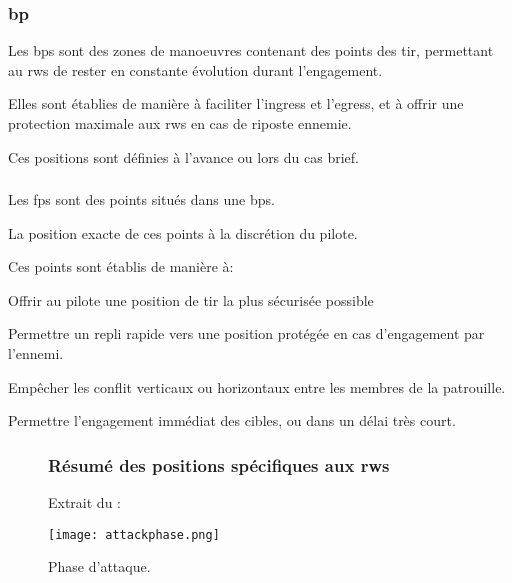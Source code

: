\subsubsection{\acrfull{bp}}

\e
    \item Les \glspl{bp} sont des zones de manoeuvres contenant des points des tir, permettant au \glspl{rw} de rester en constante évolution durant l’engagement.
    \item Elles sont établies de manière à faciliter l’ingress et l’egress, et à offrir une protection maximale aux \glspl{rw} en cas de riposte ennemie.
    \item Ces positions sont définies à l’avance ou lors du \gls{cas} brief.
\ed

\subsubsection{}

\e
    \item Les \glspl{fp} sont des points situés dans une \glspl{bp}.
    \item La position exacte de ces points à la discrétion du pilote.
    \item Ces points sont établis de manière à:
    \ee
        \item Offrir au pilote une position de tir la plus sécurisée possible
        \item Permettre un repli rapide vers une position protégée en cas d'engagement par l'ennemi.
        \item Empêcher les conflit verticaux ou horizontaux entre les membres de la patrouille.
        \item Permettre l'engagement immédiat des cibles, ou dans un délai très court.
    \ed
\ed

\begin{figure}[H]
    \begin{minipage}{\textwidth}
        \subsubsection{Résumé des positions spécifiques aux \gls{rw}s}
        \e
            \item Extrait du \jp:\\
        \ed
    \end{minipage}
    \texttt{[image: attackphase.png]}
    \caption{Phase d'attaque.}
    \label{fig:attackphase}
\end{figure}

